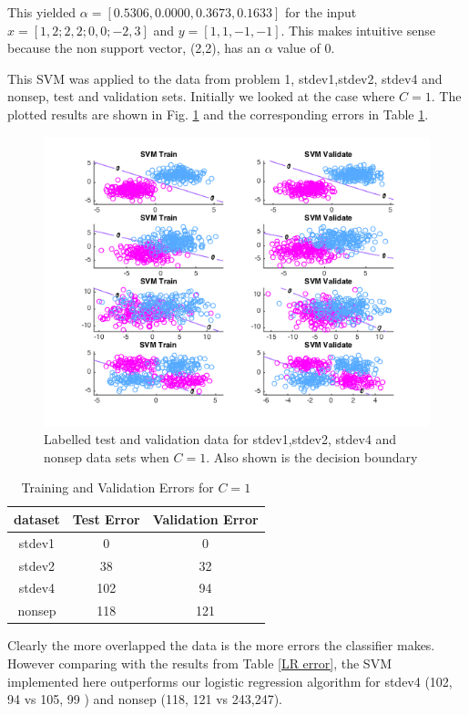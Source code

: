 \documentclass[10pt,twocolumn]{article}
\begin{document}
This yielded $\alpha = [0.5306, 0.0000, 0.3673, 0.1633]$ for the input $x = [1,2 ; 2,2 ; 0,0 ; -2,3]$ and $y = [1,1,-1,-1]$. This makes intuitive sense because the non support vector, (2,2), has an $\alpha$ value of 0.


This SVM was applied to the data from problem 1, stdev1,stdev2, stdev4 and nonsep, test and validation sets. Initially we looked at the case where $C =1$. The plotted results are shown in Fig. \ref{SVM C1} and the corresponding errors in Table \ref{SVM C1 T}. 


 \begin{figure}[H]
\center
\includegraphics[scale =.4]{p2C1.png}
\caption{Labelled test and validation data for stdev1,stdev2, stdev4 and nonsep data sets when $C=1$. Also shown is the decision boundary }
\label{SVM C1}
\end{figure}

 \begin{table}
 \caption{ Training and Validation Errors for $C=1$}
  \begin{tabular}{ | c | c | c | }
 \hline
 dataset & Test Error & Validation Error  \\ \hline 
 stdev1 & 0 & 0 \\ \hline
 stdev2 & 38 & 32 \\ \hline
 stdev4 & 102 & 94 \\ \hline 
 nonsep & 118 & 121 \\ \hline
 \end{tabular}
 \label{SVM C1 T}
\end{table}


Clearly the more overlapped the data is the more errors the classifier makes. However comparing with the results from Table \ref{LR error}, the SVM implemented here outperforms our logistic regression algorithm for stdev4 (102, 94 vs 105, 99 ) and nonsep (118, 121 vs  243,247). 
\end{document}
